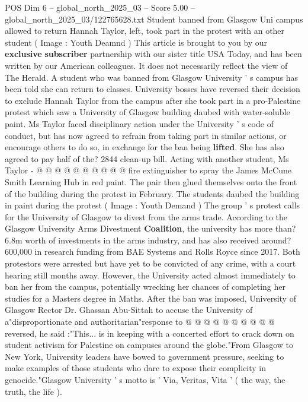 \begin{textsample}{POS Dim 6 – global\_north\_2025\_03 – Score 5.00 – global\_north\_2025\_03/122765628.txt}  \label{ex:f6_pos_229}
Student banned from Glasgow Uni campus allowed to return Hannah Taylor, left, took part in the protest with an other student ( Image : Youth Deamnd ) This article is brought to you by our \textbf{exclusive} \textbf{subscriber} partnership with our sister title USA Today, and has been written by our American colleagues.
It does not necessarily reflect the view of The Herald.
A student who was banned from Glasgow University ' s campus has been told she can return to classes.
University bosses have reversed their decision to exclude Hannah Taylor from the campus after she took part in a pro-Palestine protest which saw a University of Glasgow building daubed with water-soluble paint.
Ms Taylor faced disciplinary action under the University ' s code of conduct, but has now agreed to refrain from taking part in similar actions, or encourage others to do so, in exchange for the ban being \textbf{lifted}.
She has also agreed to pay half of the? 2844 clean-up bill.
Acting with another student, Ms Taylor - @ @ @ @ @ @ @ @ @ @ fire extinguisher to spray the James McCune Smith Learning Hub in red paint.
The pair then glued themselves onto the front of the building during the protest in February.
The students daubed the building in paint during the protest ( Image : Youth Demand ) The group ' s protest calls for the University of Glasgow to divest from the arms trade.
According to the Glasgow University Arms Divestment \textbf{Coalition}, the university has more than? 6.8m worth of investments in the arms industry, and has also received around? 600,000 in research funding from BAE Systems and Rolls Royce since 2017.
Both protestors were arrested but have yet to be convicted of any crime, with a court hearing still months away.
However, the University acted almost immediately to ban her from the campus, potentially wrecking her chances of completing her studies for a Masters degree in Maths.
After the ban was imposed, University of Glasgow Rector Dr.
Ghassan Abu-Sittah to accuse the University of a"disproportionate and authoritarian"response to @ @ @ @ @ @ @ @ @ @ reversed, he said :"This... is in keeping with a concerted effort to crack down on student activism for Palestine on campuses around the globe."From Glasgow to New York, University leaders have bowed to government pressure, seeking to make examples of those students who dare to expose their complicity in genocide."Glasgow University ' s motto is ' Via, Veritas, Vita ' ( the way, the truth, the life ).

\end{textsample}
